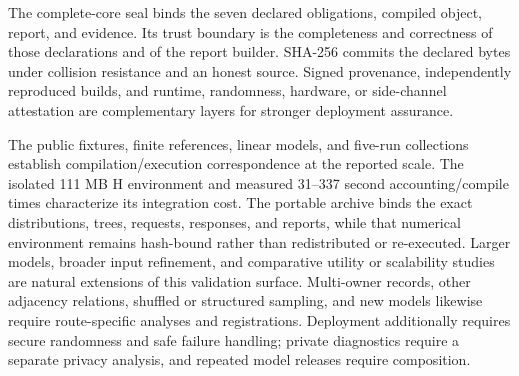 \documentclass[letterpaper]{article}
\begin{document}
The complete-core seal binds the seven declared obligations, compiled object,
report, and evidence.  Its trust boundary is the completeness and correctness
of those declarations and of the report builder.  SHA-256 commits the declared
bytes under collision resistance and an honest source.  Signed provenance,
independently reproduced builds, and runtime, randomness, hardware, or
side-channel attestation are complementary layers for stronger deployment
assurance.

The public fixtures, finite references, linear models, and five-run collections
establish compilation/execution correspondence at the reported scale.  The
isolated 111 MB H environment and measured 31--337 second accounting/compile
times characterize its integration cost.  The portable archive binds the exact
distributions, trees, requests, responses, and reports, while that numerical
environment remains hash-bound rather than redistributed or re-executed.
Larger models, broader input refinement, and comparative utility or scalability
studies are natural extensions of this validation surface.  Multi-owner
records, other adjacency relations, shuffled or structured sampling, and new
models likewise require route-specific analyses and registrations.  Deployment
additionally requires secure randomness and safe failure handling; private
diagnostics require a separate privacy analysis, and repeated model releases
require composition.


\end{document}
